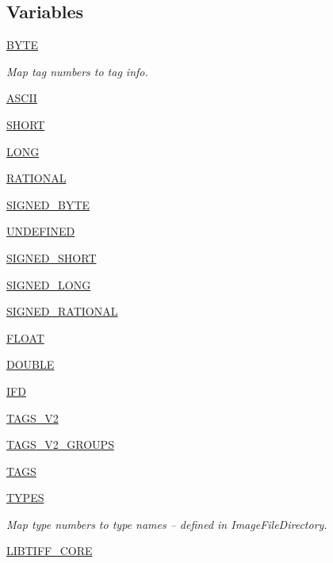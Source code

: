 \subsection*{Variables}
\begin{DoxyCompactItemize}
\item 
\hyperlink{namespacePIL_1_1TiffTags_a89c80af0fdefe3b78726ecaefbcdaa94}{B\+Y\+TE}
\begin{DoxyCompactList}\small\item\em Map tag numbers to tag info. \end{DoxyCompactList}\item 
\hyperlink{namespacePIL_1_1TiffTags_aeee60c4a9ac3a18479aeddcb768881bd}{A\+S\+C\+II}
\item 
\hyperlink{namespacePIL_1_1TiffTags_a6cd0a91176d1dbc75589247112dfa4d5}{S\+H\+O\+RT}
\item 
\hyperlink{namespacePIL_1_1TiffTags_ab3ba316796184e06fb0a6a90eefdf430}{L\+O\+NG}
\item 
\hyperlink{namespacePIL_1_1TiffTags_ac42e84e20bf25d06024889f5d07c9bf9}{R\+A\+T\+I\+O\+N\+AL}
\item 
\hyperlink{namespacePIL_1_1TiffTags_abc453efe5e68570fc3d021f5b231b15f}{S\+I\+G\+N\+E\+D\+\_\+\+B\+Y\+TE}
\item 
\hyperlink{namespacePIL_1_1TiffTags_a317152c934491bfc295d11ddc8c7f53b}{U\+N\+D\+E\+F\+I\+N\+ED}
\item 
\hyperlink{namespacePIL_1_1TiffTags_ab517a2570f1ef3879389ad4c350736cf}{S\+I\+G\+N\+E\+D\+\_\+\+S\+H\+O\+RT}
\item 
\hyperlink{namespacePIL_1_1TiffTags_a63360d123240badf42797baacc567041}{S\+I\+G\+N\+E\+D\+\_\+\+L\+O\+NG}
\item 
\hyperlink{namespacePIL_1_1TiffTags_a57480ddcedeb9812e15734103ec05dd5}{S\+I\+G\+N\+E\+D\+\_\+\+R\+A\+T\+I\+O\+N\+AL}
\item 
\hyperlink{namespacePIL_1_1TiffTags_a5458f308a64737e23c7784b93b845340}{F\+L\+O\+AT}
\item 
\hyperlink{namespacePIL_1_1TiffTags_a1a59e9365d8772af269ed5cb207d1838}{D\+O\+U\+B\+LE}
\item 
\hyperlink{namespacePIL_1_1TiffTags_a931a982861745df1d1033e7b6e2a8178}{I\+FD}
\item 
\hyperlink{namespacePIL_1_1TiffTags_af07d7f749cd8ec2bd8f250864569f17c}{T\+A\+G\+S\+\_\+\+V2}
\item 
\hyperlink{namespacePIL_1_1TiffTags_a3998f1f60d5080dbbe553f92d49919f1}{T\+A\+G\+S\+\_\+\+V2\+\_\+\+G\+R\+O\+U\+PS}
\item 
\hyperlink{namespacePIL_1_1TiffTags_a069ac0525d382b258a3bb5f8e305b730}{T\+A\+GS}
\item 
\hyperlink{namespacePIL_1_1TiffTags_aa5308944233190e38a08d0f87dc7aebf}{T\+Y\+P\+ES}
\begin{DoxyCompactList}\small\item\em Map type numbers to type names -- defined in Image\+File\+Directory. \end{DoxyCompactList}\item 
\hyperlink{namespacePIL_1_1TiffTags_ac4bddfc25db01345e10300e86d55669e}{L\+I\+B\+T\+I\+F\+F\+\_\+\+C\+O\+RE}
\end{DoxyCompactItemize}


